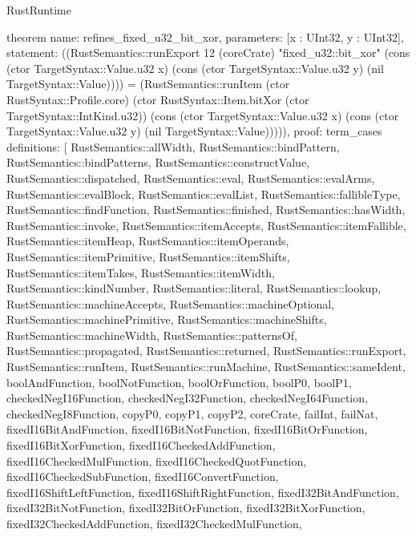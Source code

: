 \begin{lexlean}{RustRuntime}
\begin{semanticmodule}
theorem{
  name: refines_fixed_u32_bit_xor,
  parameters: [x : UInt32, y : UInt32],
  statement: ((RustSemantics::runExport 12 (coreCrate) "fixed_u32::bit_xor" (cons (ctor TargetSyntax::Value.u32 x) (cons (ctor TargetSyntax::Value.u32 y) (nil TargetSyntax::Value)))) = (RustSemantics::runItem (ctor RustSyntax::Profile.core) (ctor RustSyntax::Item.bitXor (ctor TargetSyntax::IntKind.u32)) (cons (ctor TargetSyntax::Value.u32 x) (cons (ctor TargetSyntax::Value.u32 y) (nil TargetSyntax::Value))))),
  proof: term_cases{
    definitions: [
      RustSemantics::allWidth,
      RustSemantics::bindPattern,
      RustSemantics::bindPatterns,
      RustSemantics::constructValue,
      RustSemantics::dispatched,
      RustSemantics::eval,
      RustSemantics::evalArms,
      RustSemantics::evalBlock,
      RustSemantics::evalList,
      RustSemantics::fallibleType,
      RustSemantics::findFunction,
      RustSemantics::finished,
      RustSemantics::hasWidth,
      RustSemantics::invoke,
      RustSemantics::itemAccepts,
      RustSemantics::itemFallible,
      RustSemantics::itemHeap,
      RustSemantics::itemOperands,
      RustSemantics::itemPrimitive,
      RustSemantics::itemShifts,
      RustSemantics::itemTakes,
      RustSemantics::itemWidth,
      RustSemantics::kindNumber,
      RustSemantics::literal,
      RustSemantics::lookup,
      RustSemantics::machineAccepts,
      RustSemantics::machineOptional,
      RustSemantics::machinePrimitive,
      RustSemantics::machineShifts,
      RustSemantics::machineWidth,
      RustSemantics::patternsOf,
      RustSemantics::propagated,
      RustSemantics::returned,
      RustSemantics::runExport,
      RustSemantics::runItem,
      RustSemantics::runMachine,
      RustSemantics::sameIdent,
      boolAndFunction,
      boolNotFunction,
      boolOrFunction,
      boolP0,
      boolP1,
      checkedNegI16Function,
      checkedNegI32Function,
      checkedNegI64Function,
      checkedNegI8Function,
      copyP0,
      copyP1,
      copyP2,
      coreCrate,
      failInt,
      failNat,
      fixedI16BitAndFunction,
      fixedI16BitNotFunction,
      fixedI16BitOrFunction,
      fixedI16BitXorFunction,
      fixedI16CheckedAddFunction,
      fixedI16CheckedMulFunction,
      fixedI16CheckedQuotFunction,
      fixedI16CheckedSubFunction,
      fixedI16ConvertFunction,
      fixedI16ShiftLeftFunction,
      fixedI16ShiftRightFunction,
      fixedI32BitAndFunction,
      fixedI32BitNotFunction,
      fixedI32BitOrFunction,
      fixedI32BitXorFunction,
      fixedI32CheckedAddFunction,
      fixedI32CheckedMulFunction,
}}
\end{semanticmodule}
\end{lexlean}
